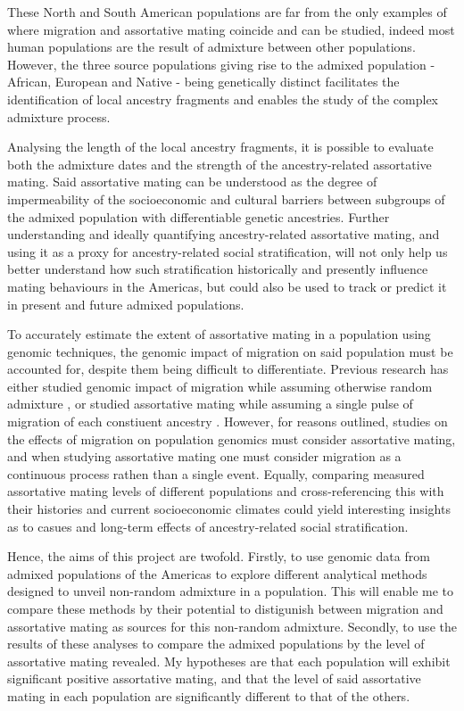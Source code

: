 \documentclass[11pt]{article}
\begin{document}
These North and South American populations are far from the only examples of where migration and assortative mating coincide and can be studied, indeed most human populations are the result of admixture between other populations. However, the three source populations giving rise to the admixed population - African, European and Native - being genetically distinct facilitates the identification of local ancestry fragments and enables the study of the complex admixture process.

Analysing the length of the local ancestry fragments, it is possible to evaluate both the admixture dates and the strength of the ancestry-related assortative mating. Said assortative mating can be understood as the degree of impermeability of the socioeconomic and cultural barriers between subgroups of the admixed population with differentiable genetic ancestries. Further understanding and ideally quantifying ancestry-related assortative mating, and using it as a proxy for ancestry-related social stratification, will not only help us better understand how such stratification historically and presently influence mating behaviours in the Americas, but could also be used to track or predict it in present and future admixed populations. 

To accurately estimate the extent of assortative mating in a population using genomic techniques, the genomic impact of migration on said population must be accounted for, despite them being difficult to differentiate. Previous research has either studied genomic impact of migration while assuming otherwise random admixture \parencite{Norris2020,Borda2020,Gravel2012}, or studied assortative mating while assuming a single pulse of migration of each constiuent ancestry \parencite{Norris2019,Risch2009,Zaitlen2017}. However, for reasons outlined, studies on the effects of migration on population genomics must consider assortative mating, and when studying assortative mating one must consider migration as a continuous process rathen than a single event. Equally, comparing measured assortative mating levels of different populations and cross-referencing this with their histories and current socioeconomic climates could yield interesting insights as to casues and long-term effects of ancestry-related social stratification. 

Hence, the aims of this project are twofold. Firstly, to use genomic data from admixed populations of the Americas to explore different analytical methods designed to unveil non-random admixture in a population. This will enable me to compare these methods by their potential to distigunish between migration and assortative mating as sources for this non-random admixture. Secondly, to use the results of these analyses to compare the admixed populations by the level of assortative mating revealed. My hypotheses are that each population will exhibit significant positive assortative mating, and that the level of said assortative mating in each population are significantly different to that of the others.
\end{document}
